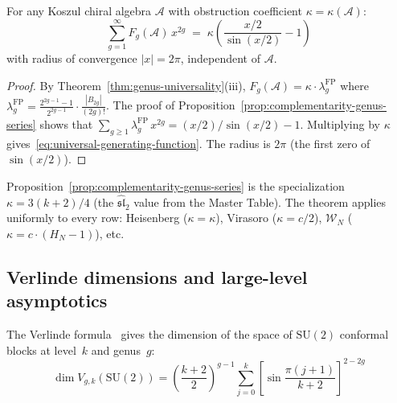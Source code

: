 \begin{theorem}\label{thm:universal-generating-function}
For any Koszul chiral algebra $\mathcal{A}$ with obstruction coefficient $\kappa = \kappa(\mathcal{A})$:
\begin{equation}\label{eq:universal-generating-function}
\sum_{g=1}^{\infty} F_g(\mathcal{A})\, x^{2g} \;=\; \kappa \left(\frac{x/2}{\sin(x/2)} - 1\right)
\end{equation}
with radius of convergence $|x| = 2\pi$, independent of $\mathcal{A}$.
\end{theorem}

\begin{proof}
By Theorem~\ref{thm:genus-universality}(iii), $F_g(\mathcal{A}) = \kappa \cdot \lambda_g^{\mathrm{FP}}$ where $\lambda_g^{\mathrm{FP}} = \frac{2^{2g-1}-1}{2^{2g-1}} \cdot \frac{|B_{2g}|}{(2g)!}$.  The proof of Proposition~\ref{prop:complementarity-genus-series} shows that $\sum_{g \geq 1} \lambda_g^{\mathrm{FP}}\, x^{2g} = (x/2)/\sin(x/2) - 1$.  Multiplying by $\kappa$ gives~\eqref{eq:universal-generating-function}.  The radius is $2\pi$ (the first zero of $\sin(x/2)$).
\end{proof}

\begin{remark}\label{rem:universal-generating-specializations}
Proposition~\ref{prop:complementarity-genus-series} is the specialization $\kappa = 3(k+2)/4$ (the $\widehat{\mathfrak{sl}}_2$ value from the Master Table).  The theorem applies uniformly to every row: Heisenberg ($\kappa = \kappa$), Virasoro ($\kappa = c/2$), $\mathcal{W}_N$ ($\kappa = c \cdot (H_N - 1)$), etc.
\end{remark}

\subsection{Verlinde dimensions and large-level asymptotics}\label{subsec:verlinde-connection}

The Verlinde formula~\cite{Verlinde} gives the dimension of the space of $\mathrm{SU}(2)$ conformal blocks at level~$k$ and genus~$g$:
\begin{equation}\label{eq:verlinde-su2}
\dim V_{g,k}(\mathrm{SU}(2)) = \left(\frac{k+2}{2}\right)^{g-1} \sum_{j=0}^{k} \left[\sin\frac{\pi(j+1)}{k+2}\right]^{2-2g}
\end{equation}

